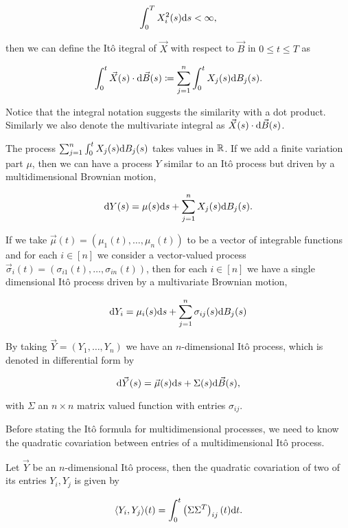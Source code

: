 \begin{equation*}
    \int_0^T X_i^2(s) \mathrm d s < \infty,
\end{equation*}

\noindent then we can define the Itô itegral of $\vec X$ with respect to $\vec B$ in $0 \le t \le T$ as

\begin{equation*}
    \int_0^t \vec X(s) \cdot \mathrm d \vec B(s) \coloneqq \sum_{j=1}^n \int_0^t X_j(s) \mathrm d B_j (s).
\end{equation*}

Notice that the integral notation suggests the similarity with a dot product. Similarly we also denote the multivariate integral as $\vec X(s) \cdot \mathrm d \vec B(s)$.

The process $\sum_{j=1}^n \int_0^t X_j(s) \mathrm d B_j (s)$ takes values in $\mathbb R$. If we add a finite variation part $\mu$, then we can have a process $Y$ similar to an Itô process but driven by a multidimensional Brownian motion,

\begin{equation*}
    \mathrm d Y (s) = \mu(s) \mathrm d s + \sum_{j=1}^n X_j(s) \mathrm d B_j (s).
\end{equation*}

If we take $\vec \mu(t) = (\mu_1(t), \dots, \mu_n (t))$ to be a vector of integrable functions and for each $i \in [n]$ we consider a vector-valued process $\vec \sigma_i(t) = (\sigma_{i1}(t), \dots, \sigma_{in}(t))$, then for each $i \in [n]$ we have a single dimensional Itô process driven by a multivariate Brownian motion,

\begin{equation*}
    \mathrm d Y_i = \mu_i(s) \mathrm d s + \sum_{j=1}^n \sigma_{ij}(s) \mathrm d B_j (s)
\end{equation*}


By taking $\vec Y = (Y_1, \dots, Y_n)$ we have an $n$-dimensional Itô process, which is denoted in differential form by

\begin{equation*}
    \mathrm d \vec Y (s) = \vec \mu (s) \mathrm d s + \Sigma (s) \mathrm d \vec B (s),
\end{equation*}

\noindent with $\Sigma$ an $n\times n$ matrix valued function with entries $\sigma_{ij}$.

Before stating the Itô formula for multidimensional processes, we need to know the quadratic covariation between entries of a multidimensional Itô process. 

\begin{theorem}
    Let $\vec Y$ be an $n$-dimensional Itô process, then the quadratic covariation of two of its entries $Y_i, Y_j$ is given by

    \begin{equation*}
        \langle Y_i, Y_j \rangle (t) = \int_0^t \left( \Sigma \Sigma^T \right)_{ij} (t) \mathrm d t.
    \end{equation*}
\end{theorem}

